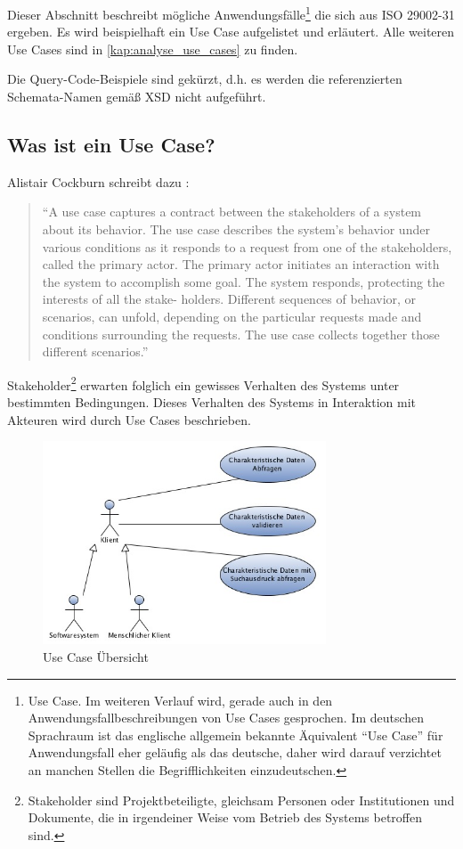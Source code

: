 Dieser Abschnitt beschreibt mögliche Anwendungsfälle\footnote{Use Case. Im weiteren Verlauf wird, gerade auch in den Anwendungsfallbeschreibungen von Use Cases gesprochen. Im deutschen Sprachraum ist das englische allgemein bekannte Äquivalent \enquote{Use Case} für Anwendungsfall eher geläufig als das deutsche, daher wird darauf verzichtet an manchen Stellen die Begrifflichkeiten einzudeutschen.} die sich aus ISO 29002-31 ergeben. 
Es wird beispielhaft ein Use Case aufgelistet und erläutert. Alle weiteren Use Cases sind in \autoref{kap:analyse_use_cases} zu finden. 

Die Query-Code-Beispiele sind gekürzt, d.h. es werden die referenzierten Schemata-Namen gemäß XSD nicht aufgeführt. 

\subsection{Was ist ein Use Case?}

Alistair Cockburn schreibt dazu \citep[Vergl.][Kap. 1.1]{cockburn2000}:

\begin{quotation}
\enquote{A use case captures a contract between the stakeholders of a system about its behavior. The use case describes the system’s behavior under various conditions as it responds to a request from one of the stakeholders, called the primary actor. The primary actor initiates an interaction with the system to accomplish some goal. The system responds, protecting the interests of all the stake- holders. Different sequences of behavior, or scenarios, can unfold, depending on the particular requests made and conditions surrounding the requests. The use case collects together those different scenarios.}
\end{quotation}

\gls{Stakeholder}\footnote{Stakeholder sind Projektbeteiligte, gleichsam Personen oder Institutionen und Dokumente, die in irgendeiner Weise vom Betrieb des Systems betroffen sind.} erwarten folglich ein gewisses Verhalten des Systems unter bestimmten Bedingungen. Dieses Verhalten des Systems in Interaktion mit Akteuren wird durch \glspl{Use Case} beschrieben.

\begin{figure}[htbp]
	\centering
		\includegraphics[width=0.75\textwidth]{images/usecases_plib.jpg}
	\caption{Use Case Übersicht}
	\label{fig:use_case_uebersicht}
\end{figure}


